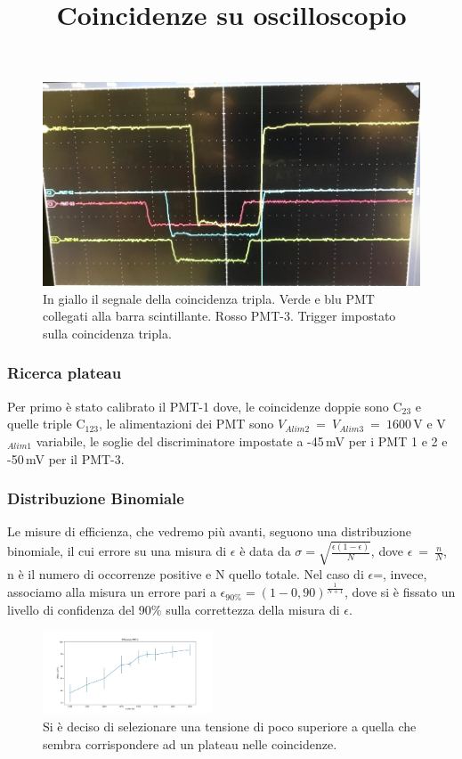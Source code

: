 \documentclass[a4paper,twocolumn]{article}
\begin{document}
\begin{figure}
\centering
\title{Coincidenze su oscilloscopio}
\begin{center}
\includegraphics[scale=0.35]{./immagini/TimeOfFlight/CoincOscill.jpg}
\caption{In giallo il segnale della coincidenza tripla. Verde e blu PMT collegati alla barra scintillante. Rosso PMT-3. Trigger impostato sulla coincidenza tripla.}
\label{fig:ExCoinc}
\end{center}
\end{figure}

\subsubsection{Ricerca plateau}
\label{sec:CoincPla}
Per primo è stato calibrato il PMT-1 dove, le coincidenze doppie sono C$_{23}$ e quelle triple C$_{123}$, le alimentazioni dei PMT sono $V_{Alim2}\:=\:V_{Alim3}\:=\:1600$\,V e V$_{Alim1}$ variabile, le soglie del discriminatore impostate a -45\,mV per i PMT 1 e 2 e -50\,mV per il PMT-3.

\subsubsection*{Distribuzione Binomiale}
\label{sec:DistrBino}
Le misure di efficienza, che vedremo più avanti, seguono una distribuzione binomiale, il cui errore su una misura di $\epsilon$ è data da $\sigma =\sqrt{\frac{\epsilon(1-\epsilon)}{N}}$, dove $\epsilon\:=\:\frac{n}{N}$, n è il numero di occorrenze positive e N quello totale. Nel caso di $\epsilon$\:=, invece, associamo alla misura un errore pari a $\epsilon_{90\%} = (1-0,90)^{\frac{1}{N+1}}$, dove si è fissato un livello di confidenza del 90$\%$ sulla correttezza della misura di $\epsilon$.

\begin{figure}[H]
\centering
\includegraphics[width=0.45\textwidth]{./immagini/TimeOfFlight/EffPMT145mV}
\caption{Si è deciso di selezionare una tensione di poco superiore a quella che sembra corrispondere ad un plateau nelle coincidenze.}
\label{fig:EffPMT145mV}
\end{figure}
\end{document}
